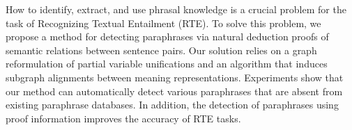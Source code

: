 How to identify, extract, and use phrasal knowledge is a crucial problem for the task of Recognizing Textual Entailment (RTE). To solve this problem, we propose a method for detecting paraphrases via natural deduction proofs of semantic relations between sentence pairs. Our solution relies on a graph reformulation of partial variable unifications and an algorithm that induces subgraph alignments between meaning representations. Experiments show that our method can automatically detect various paraphrases that are absent from existing paraphrase databases. In addition, the detection of paraphrases using proof information improves the accuracy of RTE tasks.
